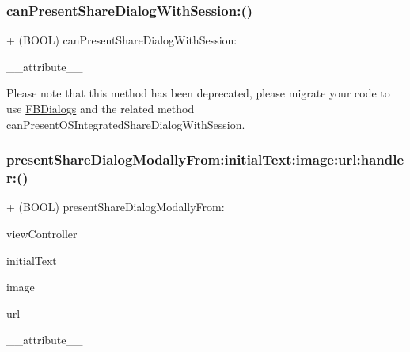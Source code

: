 \subsubsection{\texorpdfstring{can\+Present\+Share\+Dialog\+With\+Session\+:()}{canPresentShareDialogWithSession:()}\hspace{0.1cm}{\footnotesize\ttfamily [5/5]}}
{\footnotesize\ttfamily + (B\+O\+OL) can\+Present\+Share\+Dialog\+With\+Session\+: \begin{DoxyParamCaption}\item[{((deprecated))}]{\+\_\+\+\_\+attribute\+\_\+\+\_\+ }\end{DoxyParamCaption}}

Please note that this method has been deprecated, please migrate your code to use {\ttfamily \hyperlink{interfaceFBDialogs}{F\+B\+Dialogs}} and the related method {\ttfamily can\+Present\+O\+S\+Integrated\+Share\+Dialog\+With\+Session}. \mbox{\label{interfaceFBNativeDialogs_a536cf508be27488381344840016d83a1}} 
\subsubsection{\texorpdfstring{present\+Share\+Dialog\+Modally\+From\+:initial\+Text\+:image\+:url\+:handler\+:()}{presentShareDialogModallyFrom:initialText:image:url:handler:()}\hspace{0.1cm}{\footnotesize\ttfamily [1/5]}}
{\footnotesize\ttfamily + (B\+O\+OL) present\+Share\+Dialog\+Modally\+From\+: \begin{DoxyParamCaption}\item[{(U\+I\+View\+Controller $\ast$)}]{view\+Controller }\item[{initialText:(N\+S\+String $\ast$)}]{initial\+Text }\item[{image:(U\+I\+Image $\ast$)}]{image }\item[{url:(N\+S\+U\+RL $\ast$)}]{url }\item[{handler:((deprecated))}]{\+\_\+\+\_\+attribute\+\_\+\+\_\+ }\end{DoxyParamCaption}}

